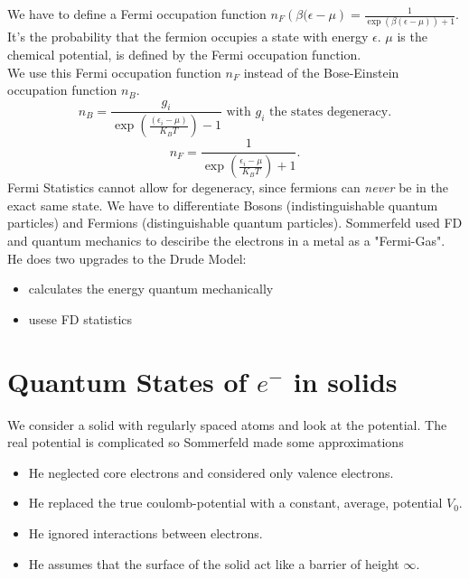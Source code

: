 \documentclass{report}
\begin{document}
We have to define a Fermi occupation function $n_F\left( \beta(\epsilon - \mu \right) = \frac{1}{\exp\left( \beta(\epsilon - \mu) \right) + 1 } $. It's the probability that the fermion occupies a state with energy $\epsilon$. $\mu$ is the chemical potential, is defined by the Fermi occupation function.\\
We use this Fermi occupation function $n_F$ instead of the Bose-Einstein occupation function $n_B$.\[
	n_B = \frac{g_i}{\exp\left( \frac{\left( \epsilon_i - \mu \right) }{K_BT} \right) -1} \text{ with $g_i$ the states degeneracy}
.\] \[
n_F = \frac{1}{\exp\left( \frac{\epsilon_i - \mu}{K_B T} \right) +1}
.\] Fermi Statistics cannot allow for degeneracy, since fermions can \emph{never} be in the exact same state. We have to differentiate Bosons (indistinguishable quantum particles) and Fermions (distinguishable quantum particles).
Sommerfeld used FD and quantum mechanics to desciribe the electrons in a metal as a "Fermi-Gas". He does two upgrades to the Drude Model:
\begin{itemize}
	\item calculates the energy quantum mechanically
	\item usese FD statistics
\end{itemize}
\section{Quantum States of $e^{-}$ in solids}
We consider a solid with regularly spaced atoms and look at the potential. The real potential is complicated so Sommerfeld made some approximations
\begin{itemize}
	\item He neglected core electrons and considered only valence electrons.
	\item He replaced the true coulomb-potential with a constant, average, potential $V_0$.
	\item He ignored interactions between electrons.
	\item He assumes that the surface of the solid act like a barrier of height $\infty$.
\end{itemize}
\end{document}
